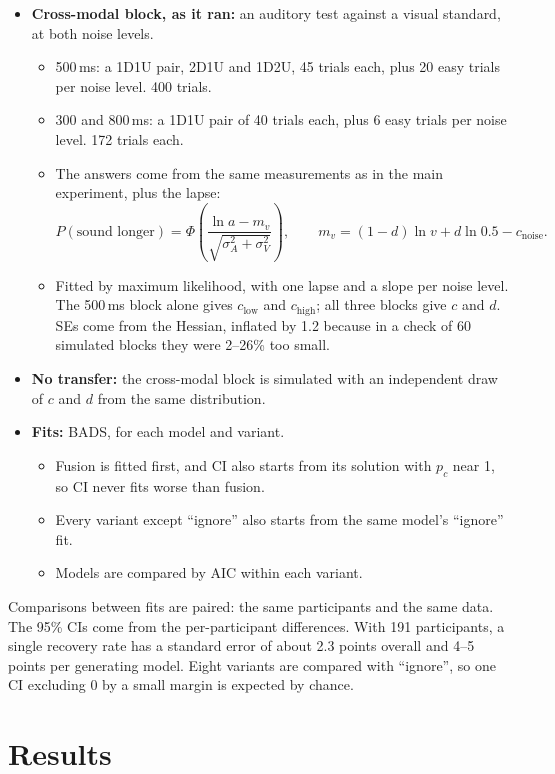 \documentclass[11pt,a4paper]{article}
\newcommand{\pc}{p_c}
\begin{document}
\begin{itemize}
\begin{itemize}
  \end{itemize}
\item \textbf{Cross-modal block, as it ran:} an auditory test against a visual standard, at both noise levels.
  \begin{itemize}
  \item 500\,ms: a 1D1U pair, 2D1U and 1D2U, 45 trials each, plus 20 easy trials per noise level. 400 trials.
  \item 300 and 800\,ms: a 1D1U pair of 40 trials each, plus 6 easy trials per noise level. 172 trials each.
  \item The answers come from the same measurements as in the main experiment, plus the lapse:
  \[ P(\text{sound longer}) = \Phi\!\left(\frac{\ln a - m_v}{\sqrt{\sigma_A^2 + \sigma_V^2}}\right), \qquad m_v = (1-d)\ln v + d \ln 0.5 - c_\text{noise}. \]
  \item Fitted by maximum likelihood, with one lapse and a slope per noise level. The 500\,ms block alone gives $c_\text{low}$ and $c_\text{high}$; all three blocks give $c$ and $d$. SEs come from the Hessian, inflated by 1.2 because in a check of 60 simulated blocks they were 2--26\% too small.
  \end{itemize}
\item \textbf{No transfer:} the cross-modal block is simulated with an independent draw of $c$ and $d$ from the same distribution.
\item \textbf{Fits:} BADS, for each model and variant.
  \begin{itemize}
  \item Fusion is fitted first, and CI also starts from its solution with $\pc$ near 1, so CI never fits worse than fusion.
  \item Every variant except ``ignore'' also starts from the same model's ``ignore'' fit.
  \item Models are compared by AIC within each variant.
  \end{itemize}
\end{itemize}
Comparisons between fits are paired: the same participants and the same data. The 95\% CIs come from the per-participant differences. With 191 participants, a single recovery rate has a standard error of about 2.3 points overall and 4--5 points per generating model. Eight variants are compared with ``ignore'', so one CI excluding 0 by a small margin is expected by chance.

\section{Results}\label{sec:results}
\end{document}
